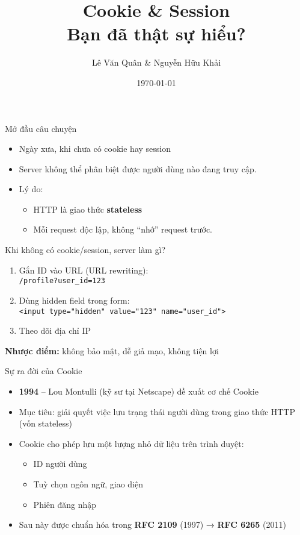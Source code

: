 \documentclass[aspectratio=169]{beamer}
\title{Cookie \& Session\\Bạn đã thật sự hiểu?}
\author{Lê Văn Quân \& Nguyễn Hữu Khải}
\date{\today}
\begin{document}
\begin{frame}
  \titlepage
\end{frame}

\begin{frame}{Mở đầu câu chuyện}
  \begin{itemize}
    \item Ngày xưa, khi chưa có cookie hay session
    \item Server không thể phân biệt được người dùng nào đang truy cập.
    \item Lý do:
    \begin{itemize}
        \item HTTP là giao thức \textbf{stateless}
        \item Mỗi request độc lập, không ``nhớ'' request trước.
    \end{itemize}
  \end{itemize}
\end{frame}

\begin{frame}{Khi không có cookie/session, server làm gì?}
  \begin{enumerate}
    \item Gắn ID vào URL (URL rewriting):\\
    \texttt{/profile?user\_id=123}
    \item Dùng hidden field trong form:\\
    \texttt{<input type="hidden" value="123" name="user\_id">}
    \item Theo dõi địa chỉ IP
  \end{enumerate}
  \vspace{1em}
  \textbf{Nhược điểm:} không bảo mật, dễ giả mạo, không tiện lợi
\end{frame}

\begin{frame}{Sự ra đời của Cookie}
  \begin{itemize}
    \item \textbf{1994} – Lou Montulli (kỹ sư tại Netscape) đề xuất cơ chế Cookie
    \item Mục tiêu: giải quyết việc lưu trạng thái người dùng trong giao thức HTTP (vốn stateless)
    \item Cookie cho phép lưu một lượng nhỏ dữ liệu trên trình duyệt:
    \begin{itemize}
      \item ID người dùng
      \item Tuỳ chọn ngôn ngữ, giao diện
      \item Phiên đăng nhập
    \end{itemize}
    \item Sau này được chuẩn hóa trong \textbf{RFC 2109} (1997) → \textbf{RFC 6265} (2011)
  \end{itemize}
\end{frame}
\end{document}
